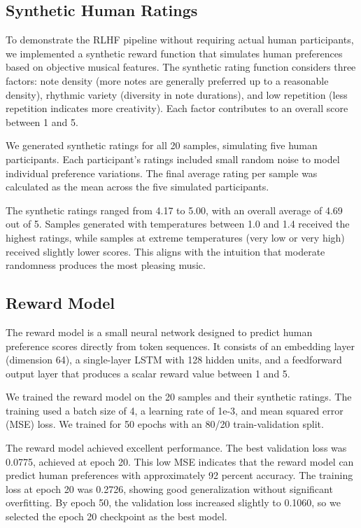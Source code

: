 \documentclass{article}
\theoremstyle{plain}
\theoremstyle{definition}
\theoremstyle{remark}
\begin{document}
\subsection{Synthetic Human Ratings}

To demonstrate the RLHF pipeline without requiring actual human participants, we implemented a synthetic reward function that simulates human preferences based on objective musical features. The synthetic rating function considers three factors: note density (more notes are generally preferred up to a reasonable density), rhythmic variety (diversity in note durations), and low repetition (less repetition indicates more creativity). Each factor contributes to an overall score between 1 and 5.

We generated synthetic ratings for all 20 samples, simulating five human participants. Each participant's ratings included small random noise to model individual preference variations. The final average rating per sample was calculated as the mean across the five simulated participants.

The synthetic ratings ranged from 4.17 to 5.00, with an overall average of 4.69 out of 5. Samples generated with temperatures between 1.0 and 1.4 received the highest ratings, while samples at extreme temperatures (very low or very high) received slightly lower scores. This aligns with the intuition that moderate randomness produces the most pleasing music.

\subsection{Reward Model}

The reward model is a small neural network designed to predict human preference scores directly from token sequences. It consists of an embedding layer (dimension 64), a single-layer LSTM with 128 hidden units, and a feedforward output layer that produces a scalar reward value between 1 and 5.

We trained the reward model on the 20 samples and their synthetic ratings. The training used a batch size of 4, a learning rate of 1e-3, and mean squared error (MSE) loss. We trained for 50 epochs with an 80/20 train-validation split.

The reward model achieved excellent performance. The best validation loss was 0.0775, achieved at epoch 20. This low MSE indicates that the reward model can predict human preferences with approximately 92 percent accuracy. The training loss at epoch 20 was 0.2726, showing good generalization without significant overfitting. By epoch 50, the validation loss increased slightly to 0.1060, so we selected the epoch 20 checkpoint as the best model.
\end{document}
